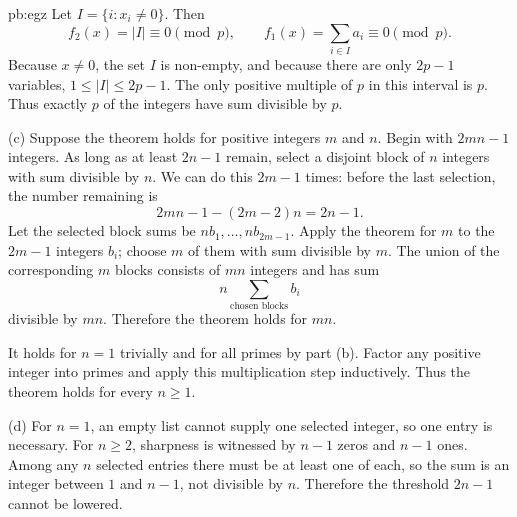 \begin{solution}{pb:egz}
Let $I=\{i:x_i\ne0\}$. Then
\[
f_2(x)=|I|\equiv0\pmod p,\qquad
f_1(x)=\sum_{i\in I}a_i\equiv0\pmod p.
\]
Because $x\ne0$, the set $I$ is non-empty, and because there are only $2p-1$ variables, $1\le|I|\le2p-1$. The only positive multiple of $p$ in this interval is $p$. Thus exactly $p$ of the integers have sum divisible by $p$.

(c) Suppose the theorem holds for positive integers $m$ and $n$. Begin with $2mn-1$ integers. As long as at least $2n-1$ remain, select a disjoint block of $n$ integers with sum divisible by $n$. We can do this $2m-1$ times: before the last selection, the number remaining is
\[
2mn-1-(2m-2)n=2n-1.
\]
Let the selected block sums be $nb_1,\ldots,nb_{2m-1}$. Apply the theorem for $m$ to the $2m-1$ integers $b_i$; choose $m$ of them with sum divisible by $m$. The union of the corresponding $m$ blocks consists of $mn$ integers and has sum
\[
n\sum_{\text{chosen blocks}}b_i
\]
divisible by $mn$. Therefore the theorem holds for $mn$.

It holds for $n=1$ trivially and for all primes by part (b). Factor any positive integer into primes and apply this multiplication step inductively. Thus the theorem holds for every $n\ge1$.

(d) For $n=1$, an empty list cannot supply one selected integer, so one entry is necessary. For $n\ge2$, sharpness is witnessed by $n-1$ zeros and $n-1$ ones. Among any $n$ selected entries there must be at least one of each, so the sum is an integer between $1$ and $n-1$, not divisible by $n$. Therefore the threshold $2n-1$ cannot be lowered.
\end{solution}


